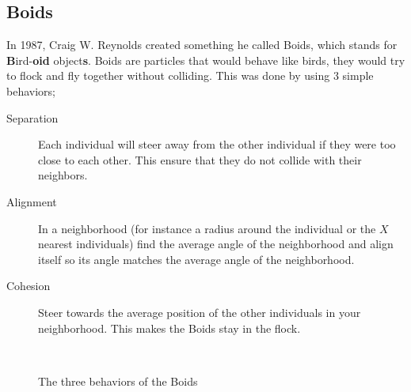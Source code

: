 \subsection{Boids}
In 1987\cite{Reynolds}, Craig W. Reynolds created something he called Boids, which stands for \textbf{B}ird-\textbf{oid} object\textbf{s}. Boids are particles that would behave like birds, they would try to flock and fly together without colliding. This was done by using 3 simple behaviors;
\begin{description}
    \item[Separation]
        Each individual will steer away from the other individual if they were too close to each other. This ensure that they do not collide with their neighbors.
    \item[Alignment]
        In a neighborhood (for instance a radius around the individual or the $X$ nearest individuals) find the average angle of the neighborhood and align itself so its angle matches the average angle of the neighborhood.
    \item[Cohesion]
        Steer towards the average position of the other individuals in your neighborhood. This makes the Boids stay in the flock.
\end{description}
\begin{figure}[H]
    \centering
    \hfill
    \unskip\ \vrule\ 
    \hfill
    \unskip\ \vrule\ 
            \caption[Boids behavior]{The three behaviors of the Boids}
            \label{fig:boidbehavior}
\end{figure}

